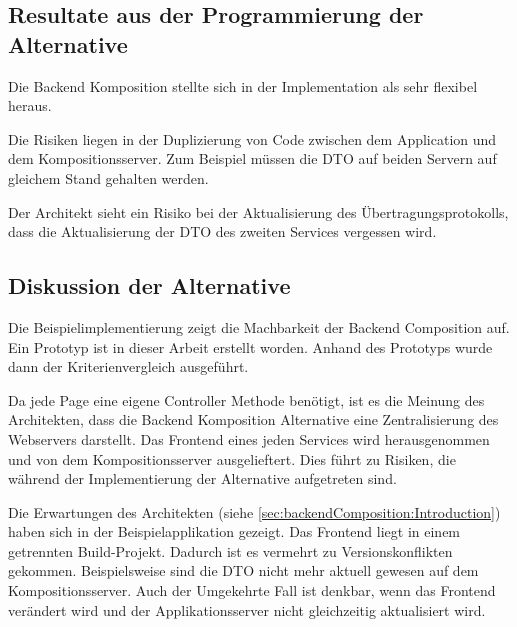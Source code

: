 \subsection{Resultate aus der Programmierung der Alternative}
Die Backend Komposition  stellte sich in der Implementation als sehr flexibel heraus. 

Die  Risiken liegen in der Duplizierung von Code zwischen dem Application und dem Kompositionsserver. Zum Beispiel müssen die \ac{DTO} auf beiden Servern auf gleichem Stand gehalten werden.

Der Architekt sieht ein Risiko bei der Aktualisierung des Übertragungsprotokolls, dass die Aktualisierung der \ac{DTO} des zweiten Services vergessen wird.

\subsection{Diskussion der Alternative}
Die Beispielimplementierung zeigt die Machbarkeit der Backend Composition auf. Ein Prototyp ist in dieser Arbeit erstellt worden. Anhand des Prototyps wurde dann der Kriterienvergleich ausgeführt.

Da jede Page eine eigene Controller Methode benötigt, ist es die Meinung des Architekten, dass die Backend Komposition Alternative eine Zentralisierung des Webservers darstellt. Das Frontend eines jeden Services wird herausgenommen und von dem Kompositionsserver ausgelieftert. Dies führt zu Risiken, die während der Implementierung der Alternative aufgetreten sind.

Die  Erwartungen des Architekten (siehe \ref{sec:backendComposition:Introduction}) haben sich in der Beispielapplikation gezeigt. Das Frontend liegt in einem getrennten Build-Projekt. Dadurch ist es vermehrt zu Versionskonflikten gekommen. Beispielsweise sind die \ac{DTO} nicht mehr aktuell gewesen auf dem Kompositionsserver. Auch der Umgekehrte Fall ist denkbar, wenn das Frontend verändert wird und der Applikationsserver nicht gleichzeitig aktualisiert wird.
\newpage